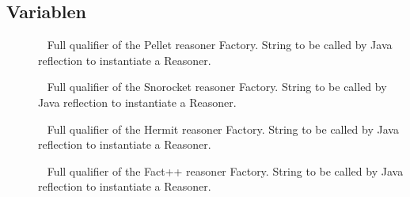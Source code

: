 \subsection{Variablen}
\begin{description}
\item[{\label{ontologyFramework.OFContextManagement.OWLLibrary.PELLET_reasonerFactoryQualifier}}]
~ Full qualifier of the Pellet reasoner Factory. String to be called by
 Java reflection to instantiate a Reasoner.
\item[{\label{ontologyFramework.OFContextManagement.OWLLibrary.SNOROCKET_reasonerFactoryQualifier}}]
~ Full qualifier of the Snorocket reasoner Factory. String to be called by
 Java reflection to instantiate a Reasoner.
\item[{\label{ontologyFramework.OFContextManagement.OWLLibrary.HERMIT_reasonerFactoryQualifier}}]
~ Full qualifier of the Hermit reasoner Factory. String to be called by
 Java reflection to instantiate a Reasoner.
\item[{\label{ontologyFramework.OFContextManagement.OWLLibrary.FACTPLUSPLUS_reasonerFactoryQualifier}}]
~ Full qualifier of the Fact++ reasoner Factory. String to be called by
 Java reflection to instantiate a Reasoner.
\end{description}
